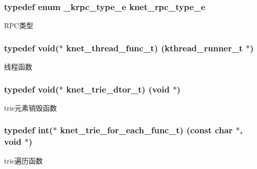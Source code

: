 \subsubsection[{knet\+\_\+rpc\+\_\+type\+\_\+e}]{\setlength{\rightskip}{0pt plus 5cm}typedef enum {\bf \+\_\+krpc\+\_\+type\+\_\+e}  {\bf knet\+\_\+rpc\+\_\+type\+\_\+e}}\label{a00054_a6fe1ebc0ddea56dd3c337115c1e10bc4_a6fe1ebc0ddea56dd3c337115c1e10bc4}
R\+P\+C类型 \hypertarget{a00054_a8741dac4a9f8d97603eb3a30a3473b13_a8741dac4a9f8d97603eb3a30a3473b13}{}
\subsubsection[{knet\+\_\+thread\+\_\+func\+\_\+t}]{\setlength{\rightskip}{0pt plus 5cm}typedef void($\ast$ knet\+\_\+thread\+\_\+func\+\_\+t) ({\bf kthread\+\_\+runner\+\_\+t} $\ast$)}\label{a00054_a8741dac4a9f8d97603eb3a30a3473b13_a8741dac4a9f8d97603eb3a30a3473b13}
线程函数 \hypertarget{a00054_a46741b0dab7bbb26d611c429ee64d78c_a46741b0dab7bbb26d611c429ee64d78c}{}
\subsubsection[{knet\+\_\+trie\+\_\+dtor\+\_\+t}]{\setlength{\rightskip}{0pt plus 5cm}typedef void($\ast$ knet\+\_\+trie\+\_\+dtor\+\_\+t) (void $\ast$)}\label{a00054_a46741b0dab7bbb26d611c429ee64d78c_a46741b0dab7bbb26d611c429ee64d78c}
trie元素销毁函数 \hypertarget{a00054_ad77af676ce15810f8f713bb3eaa91fe8_ad77af676ce15810f8f713bb3eaa91fe8}{}
\subsubsection[{knet\+\_\+trie\+\_\+for\+\_\+each\+\_\+func\+\_\+t}]{\setlength{\rightskip}{0pt plus 5cm}typedef int($\ast$ knet\+\_\+trie\+\_\+for\+\_\+each\+\_\+func\+\_\+t) (const char $\ast$, void $\ast$)}\label{a00054_ad77af676ce15810f8f713bb3eaa91fe8_ad77af676ce15810f8f713bb3eaa91fe8}
trie遍历函数 \hypertarget{a00054_a66d91f7667db1f0b2983fc25e1a20f1c_a66d91f7667db1f0b2983fc25e1a20f1c}{}
